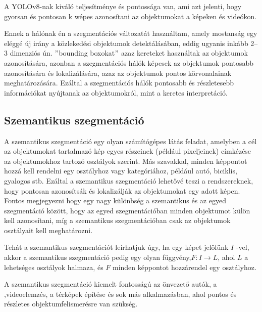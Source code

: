 \documentclass[12pt,oneside,a4paper]{article}
\theoremstyle{remark}
\begin{document}
    A YOLOv8-nak kiváló teljesítménye és pontossága van, ami azt jelenti,
hogy gyorsan és pontosan k  wépes azonosítani az objektumokat a képeken és videókon.

Ennek a hálónak én a szegmentációs változatát használtam, amely mostanság egy eléggé új
irány a közlekedési objektumok detektálásában, eddig ugyanis inkább 2--3 dimenziós ún. \("\)bounding boxokat\("\)
azaz kereteket használtak az objektumok azonosítására, azonban a szegmentációs hálók képesek az objektumok
pontosabb azonosítására és lokalizálására, azaz az objektumok pontos körvonalainak meghatározására.
Ezáltal a szegmentációs hálók pontosabb és részletesebb információkat nyújtanak az objektumokról, mint a keretes
interpretáció.


\subsection{Szemantikus szegmentáció}\label{subsec:szemantikus-szegmentacio}

A szemantikus szegmentáció egy olyan számítógépes látás feladat, amelyben a cél az objektumokat tartalmazó kép egyes
részeinek (például pixeljeinek) címkézése az objektumokhoz tartozó osztályok szerint.
Más szavakkal, minden képpontot
hozzá kell rendelni egy osztályhoz vagy kategóriához, például autó, biciklis, gyalogos stb.
Ezáltal a szemantikus szegmentáció
lehetővé teszi a  rendszereknek, hogy pontosan azonosítsák és lokalizálják az
objektumokat egy adott képen.
Fontos megjegyezni hogy egy nagy különbség a szemantikus és az egyed szegmentáció között,
hogy az egyed szegmentációban minden objektumot külön kell azonosítani, míg a szemantikus szegmentációban csak az
objektumok osztályait kell meghatározni.

Tehát a szemantikus szegmentációt leírhatjuk úgy, ha egy képet jelölünk \(I\) -vel, akkor a szemantikus
szegmentáció pedig egy olyan függvény,\(F: I \rightarrow L\), ahol \(L\) a lehetséges osztályok halmaza, és \(F\) minden
képpontot hozzárendel egy osztályhoz.

A szemantikus szegmentáció kiemelt fontosságú az önvezető autók, a
,videoelemzés, a térképek építése és sok más
alkalmazásban, ahol pontos és részletes objektumfelismerésre van szükség.
\end{document}
